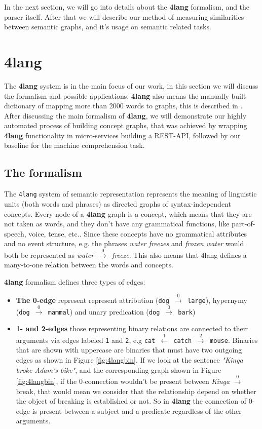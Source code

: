 In the next section, we will go into details about the \textbf{4lang} formalism, and the parser itself. After that we will describe our method of measuring similarities between semantic graphs, and it's usage on semantic related tasks.

\section{4lang}
\label{sec:4lang}
The \textbf{4lang} system is in the main focus of our work, in this section we will discuss the formalism and possible applications. \textbf{4lang} also means the manually built dictionary of mapping more than 2000 words to graphs, this is described in \cite{Kornai:2013}. After discussing the main formalism of \textbf{4lang}, we will demonstrate our highly automated process of building concept graphs, that was achieved by wrapping \textbf{4lang} functionality in micro-services building a REST-API, followed by our baseline for the machine comprehension task.

\subsection{The formalism}
The \texttt{4lang} system of semantic representation \cite{Kornai:2015a}
represents the meaning of linguistic units (both words and phrases)
as directed graphs of syntax-independent concepts. Every node of a \textbf{4lang} graph is a concept, which means that they are not taken as words, and they don't have any grammatical functions, like part-of-speech, voice, tense, etc.\cite{Recski:2016}.
Since these concepts have no grammatical attributes and no event structure, e.g.
the phrases \textit{water freezes} and \textit{frozen water} would both be
represented as \textit{water}~$\xrightarrow0$~\textit{freeze}. This also means that 4lang defines a many-to-one relation between the words and concepts. 

\textbf{4lang} formalism defines three types of edges:
\begin{itemize}
	\item \textbf{The 0-edge} represent represent attribution (\texttt{dog
		$\xrightarrow0$ large}), hypernymy (\texttt{dog $\xrightarrow0$ mammal}) and unary predication (\texttt{dog  $\xrightarrow0$ bark})
	\item \textbf{1- and 2-edges} those representing binary relations are connected to their arguments
	via edges labeled \texttt{1} and \texttt{2}, e.g \texttt{cat $\xleftarrow1$ catch $\xrightarrow2$ mouse}. Binaries that are shown with uppercase are binaries that must have two outgoing edges as shown in Figure \ref{fig:4langbin}. If we look at the sentence \textit{"Kinga broke Adam's bike"}, and the corresponding graph shown in Figure \ref{fig:4langbin}, if the 0-connection wouldn't be present between \textit{Kinga} $\xrightarrow0$ break, that would mean we consider that the relationship depend on whether the object of breaking is established or not. So in \textbf{4lang} the connection of 0-edge is present between a subject and a predicate regardless of the other arguments.
\end{itemize}

